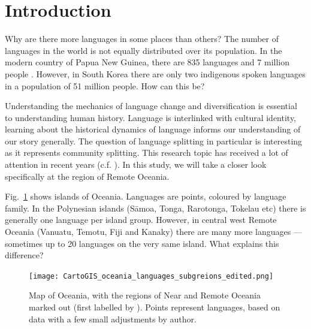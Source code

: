 \documentclass[a4paper,10pt]{article} %
\begin{document}
\newpage
{}



\newpage
\section{Introduction}
\doublespacing
Why are there more languages in some places than others? The number of languages in the world is not equally distributed over its population. In the modern country of Papua New Guinea, there are 835 languages and 7 million people \citep{ethnologue22, cia_world_factbook_2019, glottolog4_5}. However, in South Korea there are only two indigenous spoken languages in a population of 51 million people. How can this be?

Understanding the mechanics of language change and diversification is essential to understanding human history. Language is interlinked with cultural identity, learning about the historical dynamics of language informs our understanding of our story generally. The question of language splitting in particular is interesting as it represents community splitting. This research topic has received a lot of attention in recent years (c.f. \citet{gavin2017process,  greenhill2015demographic, Pacheco_Coelho_2019, hua2019ecological}). In this study, we will take a closer look specifically at the region of Remote Oceania. 

Fig.~\ref{RO_overnight_coloured_dots} shows islands of Oceania. Languages are points, coloured by language family. In the Polynesian islands (S\={a}moa, Tonga, Rarotonga, Tokelau etc) there is generally one language per island group. However, in central west Remote Oceania (Vanuatu, Temotu, Fiji and Kanaky) there are many more languages --- sometimes up to 20 languages on the very same island. What explains this difference?

\begin{figure}
\centering
\texttt{[image: CartoGIS\_oceania\_languages\_subgreions\_edited.png]}
\caption{Map of Oceania, with the regions of Near and Remote Oceania marked out (first labelled by \citet{pawley1973dating}
). Points represent languages, based on data \citet{glottolog3} with a few small adjustments by author.} 
\label{RO_overnight_coloured_dots}
\end{figure}
\end{document}
